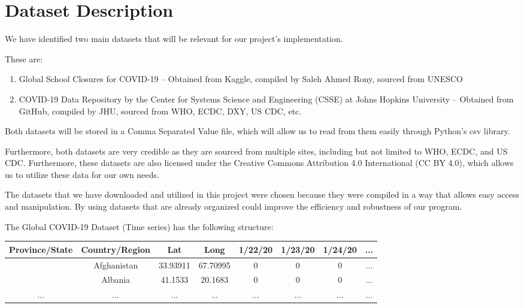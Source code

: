 \documentclass[fontsize=11pt]{article}
\begin{document}
\newpage

\section*{Dataset Description}

We have identified two main datasets that will be relevant for our project’s implementation.

These are:

\begin{enumerate}
    \item
        Global School Closures for COVID-19 – Obtained from Kaggle, compiled by Saleh Ahmed Rony, sourced from UNESCO

    \item
        COVID-19 Data Repository by the Center for Systems Science and Engineering (CSSE) at Johns Hopkins University – Obtained from GitHub, compiled by JHU, sourced from WHO, ECDC, DXY, US CDC, etc.
\end{enumerate}

Both datasets will be stored in a Comma Separated Value file, which will allow us to read from them easily through Python’s csv library.

Furthermore, both datasets are very credible as they are sourced from multiple sites, including but not limited to WHO, ECDC, and US CDC. Furthermore, these datasets are also licensed under the Creative Commons Attribution 4.0 International (CC BY 4.0), which allows us to utilize these data for our own needs.

The datasets that we have downloaded and utilized in this project were chosen because they were compiled in a way that allows easy access and manipulation. By using datasets that are already organized could improve the efficiency and robustness of our program.

The Global COVID-19 Dataset (Time series) has the following structure:

\begin{center}
    \begin{tabular}{ |c|c|c|c|c|c|c|c| }
        \hline
        Province/State & Country/Region & Lat & Long & 1/22/20 & 1/23/20 & 1/24/20 & ...\\
        \hline
         & Afghanistan & 33.93911 & 67.70995 & 0 & 0 & 0 & ... \\
        \hline
         & Albania & 41.1533 & 20.1683 & 0 & 0 & 0 & ...\\
        \hline
        ... & ... & ... & ... & ... & ... & ... & ...\\
        \hline
    \end{tabular}
\end{center}
\end{document}
